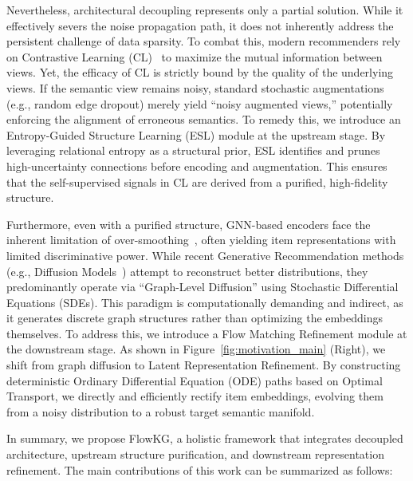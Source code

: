 Nevertheless, architectural decoupling represents only a partial solution. While it effectively severs the noise propagation path, it does not inherently address the persistent challenge of data sparsity. To combat this, modern recommenders rely on Contrastive Learning (CL)~\cite{yang2022knowledge, zou2022improving} to maximize the mutual information between views. Yet, the efficacy of CL is strictly bound by the quality of the underlying views. If the semantic view remains noisy, standard stochastic augmentations (e.g., random edge dropout) merely yield ``noisy augmented views,'' potentially enforcing the alignment of erroneous semantics. To remedy this, we introduce an Entropy-Guided Structure Learning (ESL) module at the upstream stage. By leveraging relational entropy as a structural prior, ESL identifies and prunes high-uncertainty connections before encoding and augmentation. This ensures that the self-supervised signals in CL are derived from a purified, high-fidelity structure.

Furthermore, even with a purified structure, GNN-based encoders face the inherent limitation of over-smoothing~\cite{li2018deeper,oonograph}, often yielding item representations with limited discriminative power. While recent Generative Recommendation methods (e.g., Diffusion Models~\cite{jiang2024diffkg, li2025mask}) attempt to reconstruct better distributions, they predominantly operate via ``Graph-Level Diffusion'' using Stochastic Differential Equations (SDEs). This paradigm is computationally demanding and indirect, as it generates discrete graph structures rather than optimizing the embeddings themselves. To address this, we introduce a Flow Matching Refinement module at the downstream stage. As shown in Figure~\ref{fig:motivation_main} (Right), we shift from graph diffusion to Latent Representation Refinement. By constructing deterministic Ordinary Differential Equation (ODE) paths based on Optimal Transport, we directly and efficiently rectify item embeddings, evolving them from a noisy distribution to a robust target semantic manifold.

In summary, we propose FlowKG, a holistic framework that integrates decoupled architecture, upstream structure purification, and downstream representation refinement. The main contributions of this work can be summarized  as follows:

